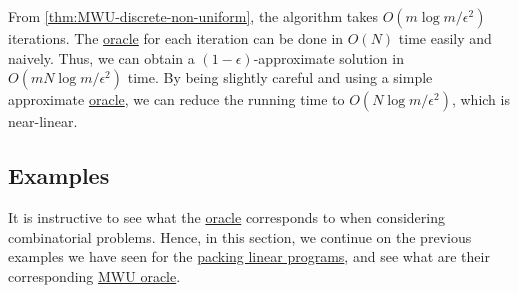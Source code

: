 \begin{remark}
	From \autoref{thm:MWU-discrete-non-uniform}, the algorithm takes \(O(m \log m / \epsilon ^2)\) iterations. The \hyperref[eq:MWU-oracle-LP]{oracle} for each iteration can be done in \(O(N)\) time easily and naively. Thus, we can obtain a \((1 - \epsilon )\)-approximate solution in \(O(m N \log m / \epsilon ^2)\) time. By being slightly careful and using a simple approximate \hyperref[eq:MWU-oracle-LP]{oracle}, we can reduce the running time to \(O(N \log m / \epsilon ^2)\), which is near-linear.
\end{remark}

\subsection{Examples}
It is instructive to see what the \hyperref[eq:MWU-oracle-LP]{oracle} corresponds to when considering combinatorial problems. Hence, in this section, we continue on the previous examples we have seen for the \hyperref[def:packing-LP]{packing linear programs}, and see what are their corresponding \hyperref[eq:MWU-oracle-LP]{MWU oracle}.

